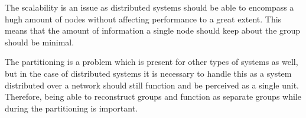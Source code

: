 	The scalability is an issue as distributed systems should be able to encompass a hugh amount of nodes without affecting performance to a great extent.
	This means that the amount of information a single node should keep about the group should be minimal.

	The partitioning is a problem which is present for other types of systems as well, but in the case of distributed systems it is necessary to handle this as a system distributed over a network should still function and be perceived as a single unit.
	Therefore, being able to reconstruct groups and function as separate groups while during the partitioning is important.
